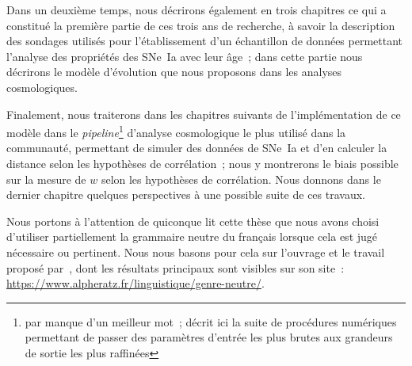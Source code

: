 \documentclass[../main/main.tex]{subfiles}
\begin{document}
Dans un deuxième temps, nous décrirons également en trois chapitres ce qui a
constitué la première partie de ces trois ans de recherche, à savoir la
description des sondages utilisés pour l'établissement d'un échantillon de
données permettant l'analyse des propriétés des SNe~Ia avec leur âge~; dans
cette partie nous décrirons le modèle d'évolution que nous proposons dans les
analyses cosmologiques.

Finalement, nous traiterons dans les chapitres suivants de l'implémentation de
ce modèle dans le \textit{pipeline}\footnote{par manque d'un meilleur mot~;
    décrit ici la suite de procédures numériques permettant de passer des
    paramètres d'entrée les plus brutes aux grandeurs de sortie les plus
raffinées} d'analyse cosmologique le plus utilisé dans la communauté,
permettant de simuler des données de SNe~Ia et d'en calculer la distance
selon les hypothèses de corrélation~; nous y montrerons le biais possible
sur la mesure de $w$ selon les hypothèses de corrélation. Nous donnons dans
le dernier chapitre quelques perspectives à une possible suite de ces
travaux.

\vfill

Nous portons à l'attention de quiconque lit cette thèse que nous avons choisi
d'utiliser partiellement la grammaire neutre du français lorsque cela est jugé
nécessaire ou pertinent. Nous nous basons pour cela sur l'ouvrage et le travail
proposé par~\cite{alpheratz2018}, dont les résultats principaux sont visibles
sur son site~: \href{https://www.alpheratz.fr/linguistique/genre-neutre/}
{https://www.alpheratz.fr/linguistique/genre-neutre/}.

\vfill


\shorthandoff{:}

\end{document}
